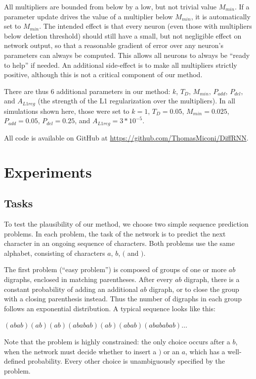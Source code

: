 \documentclass{article}
\begin{document}
All multipliers are bounded from below by a low, but not trivial
value $M_{min}$. If a parameter update drives the value of a multiplier below $M_{min}$, it is automatically set to $M_{min}$. The intended effect is that every neuron (even those with multipliers
below deletion threshold) should still have a small, but not negligible effect
on network output, so that a reasonable gradient of error over any neuron's
parameters can always be computed. This allows all neurons to always be ``ready to help'' if needed. An additional side-effect is to make all multipliers strictly positive, although this is not a critical component of our method.


There are thus 6 additional parameters in our method: $k$, $T_D$, $M_{min}$, $P_{add}$,
$P_{del}$, and $A_{L1reg}$ (the strength of the L1 regularization
over the multipliers). In all simulations shown here, those were set to $k=1$,
$T_D=0.05$,  $M_{min}=0.025$, $P_{add}=0.05$, $P_{del}=0.25$, and
$A_{L1reg}=3*10^{-5}$. 


All code is available on GitHub at \url{https://github.com/ThomasMiconi/DiffRNN}.


\section{Experiments}

\subsection{Tasks}

To test the plausibility of our method, we choose two simple sequence prediction
problems. In each problem, the task of the network is to predict the next
character in an ongoing sequence of characters. Both problems use the same
alphabet, consisting of characters $a$, $b$, $($ and $)$. 

The first problem (``easy problem'') is composed of groups of one or more $ab$
digraphs, enclosed in matching parentheses. After every $ab$ digraph, there is
a constant probability of adding an additional $ab$ digraph, or to close the
group with a closing parenthesis instead. Thus the number of digraphs in each
group follows an exponential distribution. A typical sequence looks like this:

\begin{center}
$(abab)(ab)(ab)(ababab)(ab)(abab)(abababab)\ldots$
\end{center}

Note that the problem is highly constrained: the only choice occurs after a
$b$, when the network must decide whether to insert a $)$ or an $a$, which has
a well-defined probability. Every other choice is unambiguously specified by the problem. 
\end{document}
